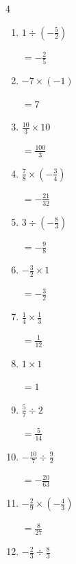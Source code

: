 \begin{multicols}{4}
\begin{enumerate}
        $\displaystyle =\frac{1}{3}$

  \item $\displaystyle 1\div{}\left(-\frac{5}{2}\right)$

        $\displaystyle =-\frac{2}{5}$

\columnbreak %

\resetques

  \item $\displaystyle -7\times{}\left(-1\right)$

        $\displaystyle =7$

  \item $\displaystyle \frac{10}{3}\times{}10$

        $\displaystyle =\frac{100}{3}$

  \item $\displaystyle \frac{7}{8}\times{}\left(-\frac{3}{4}\right)$

        $\displaystyle =-\frac{21}{32}$

  \item $\displaystyle 3\div{}\left(-\frac{8}{3}\right)$

        $\displaystyle =-\frac{9}{8}$

  \item $\displaystyle -\frac{3}{2}\times{}1$

        $\displaystyle =-\frac{3}{2}$

  \item $\displaystyle \frac{1}{4}\times{}\frac{1}{3}$

        $\displaystyle =\frac{1}{12}$

  \item $\displaystyle 1\times{}1$

        $\displaystyle =1$

  \item $\displaystyle \frac{5}{7}\div{}2$

        $\displaystyle =\frac{5}{14}$

  \item $\displaystyle -\frac{10}{7}\div{}\frac{9}{2}$

        $\displaystyle =-\frac{20}{63}$

  \item $\displaystyle -\frac{2}{9}\times{}\left(-\frac{4}{3}\right)$

        $\displaystyle =\frac{8}{27}$

\columnbreak %

  \item $\displaystyle -\frac{2}{3}\div{}\frac{8}{3}$


\end{enumerate}
\end{multicols}
